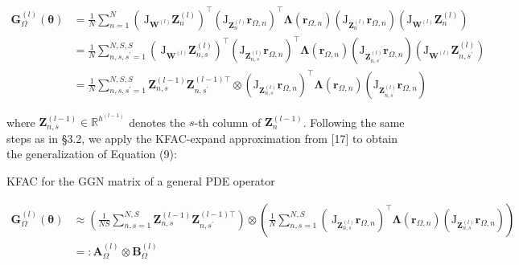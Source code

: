 \documentclass[10pt]{article}
\begin{document}
$$
\begin{aligned}
\boldsymbol{G}_{\Omega}^{(l)}(\boldsymbol{\theta}) & =\frac{1}{N} \sum_{n=1}^{N}\left(\mathrm{~J}_{\boldsymbol{W}^{(l)}} \boldsymbol{Z}_{n}^{(l)}\right)^{\top}\left(\mathrm{J}_{\boldsymbol{Z}_{n}^{(l)}} \boldsymbol{r}_{\Omega, n}\right)^{\top} \boldsymbol{\Lambda}\left(\boldsymbol{r}_{\Omega, n}\right)\left(\mathrm{J}_{\boldsymbol{Z}_{n}^{(l)}} \boldsymbol{r}_{\Omega, n}\right)\left(\mathrm{J}_{\boldsymbol{W}^{(l)}} \boldsymbol{Z}_{n}^{(l)}\right) \\
& =\frac{1}{N} \sum_{n, s, s^{\prime}=1}^{N, S, S}\left(\mathrm{~J}_{\boldsymbol{W}^{(l)}} \boldsymbol{Z}_{n, s}^{(l)}\right)^{\top}\left(\mathrm{J}_{\boldsymbol{Z}_{n, s}^{(l)}} \boldsymbol{r}_{\Omega, n}\right)^{\top} \boldsymbol{\Lambda}\left(\boldsymbol{r}_{\Omega, n}\right)\left(\mathrm{J}_{\boldsymbol{Z}_{n, s^{\prime}}^{(l)}} \boldsymbol{r}_{\Omega, n}\right)\left(\mathrm{J}_{\boldsymbol{W}^{(l)}} \boldsymbol{Z}_{n, s^{\prime}}^{(l)}\right) \\
& =\frac{1}{N} \sum_{n, s, s^{\prime}=1}^{N, S, S} \boldsymbol{Z}_{n, s}^{(l-1)} \boldsymbol{Z}_{n, s^{\prime}}^{(l-1) \top} \otimes\left(\mathrm{J}_{\boldsymbol{Z}_{n, s}^{(l)}} \boldsymbol{r}_{\Omega, n}\right)^{\top} \boldsymbol{\Lambda}\left(\boldsymbol{r}_{\Omega, n}\right)\left(\mathrm{J}_{\boldsymbol{Z}_{n, s^{\prime}}^{(l)}} \boldsymbol{r}_{\Omega, n}\right)
\end{aligned}
$$

where $\boldsymbol{Z}_{n, s}^{(l-1)} \in \mathbb{R}^{h^{(l-1)}}$ denotes the $s$-th column of $\boldsymbol{Z}_{n}^{(l-1)}$. Following the same steps as in §3.2, we apply the KFAC-expand approximation from [17] to obtain the generalization of Equation (9):

KFAC for the GGN matrix of a general PDE operator


\begin{align*}
\boldsymbol{G}_{\Omega}^{(l)}(\boldsymbol{\theta}) & \approx\left(\frac{1}{N S} \sum_{n, s=1}^{N, S} \boldsymbol{Z}_{n, s}^{(l-1)} \boldsymbol{Z}_{n, s^{\prime}}^{(l-1) \top}\right) \otimes\left(\frac{1}{N} \sum_{n, s=1}^{N, S}\left(\mathrm{~J}_{\boldsymbol{Z}_{n, s}^{(l)}} \boldsymbol{r}_{\Omega, n}\right)^{\top} \boldsymbol{\Lambda}\left(\boldsymbol{r}_{\Omega, n}\right)\left(\mathrm{J}_{\boldsymbol{Z}_{n, s}^{(l)}} \boldsymbol{r}_{\Omega, n}\right)\right)  \tag{14}\\
& =: \boldsymbol{A}_{\Omega}^{(l)} \otimes \boldsymbol{B}_{\Omega}^{(l)}
\end{align*}
\end{document}
